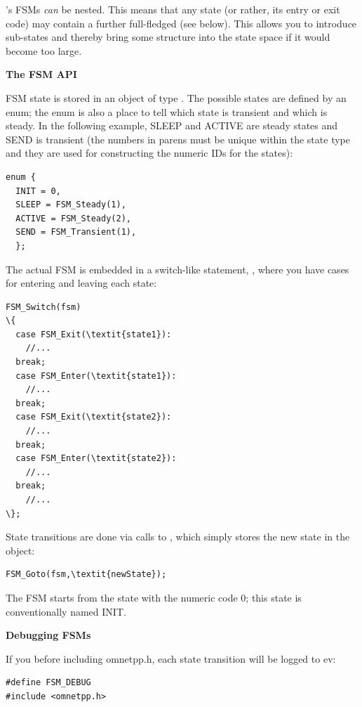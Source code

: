 {\opp}'s FSMs \textit{can} be nested. This means
that any state (or rather, its entry or exit code) may contain a
further full-fledged  (see below). This allows you
to introduce sub-states and thereby bring some structure into the
state space if it would become too large.


\textbf{The FSM API}


FSM state is stored in an object of type . The possible states 
are defined by an enum; the enum is also a place to tell which 
state is transient and which is steady. In the following example, SLEEP 
and ACTIVE are steady states and SEND is transient (the numbers 
in parens must be unique within the state type and they are used 
for constructing the numeric IDs for the states):

\begin{Verbatim}
enum {
  INIT = 0,
  SLEEP = FSM_Steady(1),
  ACTIVE = FSM_Steady(2),
  SEND = FSM_Transient(1),
  };
\end{Verbatim}



The actual FSM is embedded in a switch-like statement,
, where you have cases for entering and leaving
each state:


\begin{Verbatim}[commandchars=\\\{\}]
FSM_Switch(fsm)
\{
  case FSM_Exit(\textit{state1}): 
    //... 
  break;
  case FSM_Enter(\textit{state1}): 
    //... 
  break;
  case FSM_Exit(\textit{state2}): 
    //... 
  break;
  case FSM_Enter(\textit{state2}): 
    //... 
  break;
    //...
\};
\end{Verbatim}
  

State transitions are done via calls to
, which simply stores the new state in the
 object:

\begin{Verbatim}
FSM_Goto(fsm,\textit{newState});
\end{Verbatim}

The FSM starts from the state with the numeric code 0; this state 
is conventionally named INIT.


\textbf{Debugging FSMs}


If you  before including
omnetpp.h, each state transition will be logged to ev:


\begin{Verbatim}[commandchars=\\\{\}]
#define FSM_DEBUG
#include <omnetpp.h>
\end{Verbatim}
  


